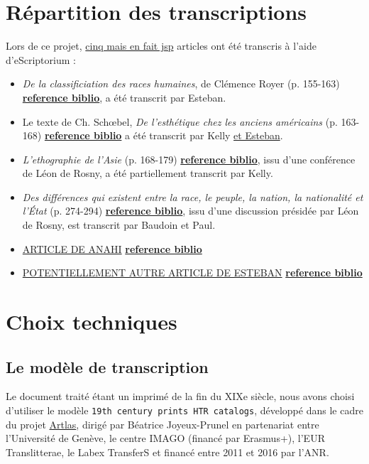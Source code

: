 \documentclass{article}
\begin{document}
	
	
	\section{Répartition des transcriptions}
	
	Lors de ce projet, \underline{cinq mais en fait jsp} articles ont été transcris à l'aide d'eScriptorium :
	\begin{itemize}
		\item \textit{De la classificiation des races humaines}, de Clémence Royer (p. 155-163) \underline{\textbf{reference biblio}}, a été transcrit par Esteban.
		\item Le texte de Ch. Schœbel, \textit{De l’esthétique chez les anciens américains} (p. 163-168) \underline{\textbf{reference biblio}} a été transcrit par Kelly \underline{et Esteban}.
		\item \textit{L'ethographie de l'Asie} (p. 168-179) \underline{\textbf{reference biblio}}, issu d'une conférence de Léon de Rosny, a été partiellement transcrit par Kelly.
		\item \textit{Des différences qui existent entre la race, le peuple, la nation, la nationalité et l'État} (p. 274-294) \underline{\textbf{reference biblio}}, issu d'une discussion présidée par Léon de Rosny, est transcrit par Baudoin et Paul.
		\item \underline{ARTICLE DE ANAHI} \underline{\textbf{reference biblio}}
		\item \underline{POTENTIELLEMENT AUTRE ARTICLE DE ESTEBAN} \underline{\textbf{reference biblio}}
	\end{itemize}
	
	
	
	\section{Choix techniques}
	
	\subsection{Le modèle de transcription}
	
	Le document traité étant un imprimé de la fin du XIXe siècle, nous avons choisi d'utiliser le modèle \texttt{19th century prints HTR catalogs}, développé dans le cadre du projet \href{https://artlas.huma-num.fr/fr/}{Artlas}, dirigé par Béatrice Joyeux-Prunel en partenariat entre l'Université de Genève, le centre IMAGO (financé par Erasmus+), l'EUR Translitterae, le Labex TransferS et financé entre 2011 et 2016 par l'ANR.
	
\end{document}
